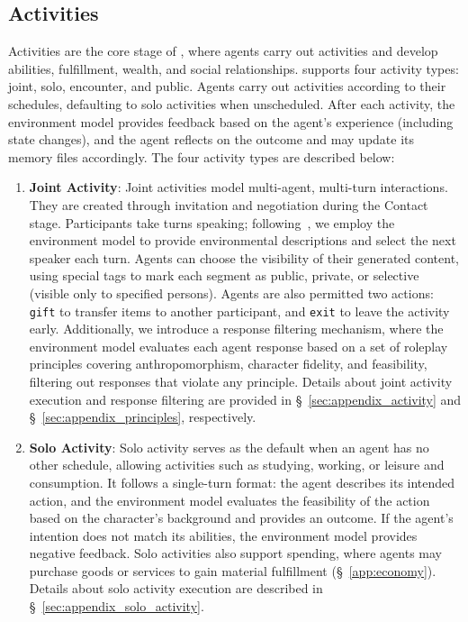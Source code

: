 \subsection{Activities}
\label{sec:activity}

Activities are the core stage of \method, where agents carry out activities and develop abilities, fulfillment, wealth, and social relationships.
\method supports four activity types: joint, solo, encounter, and public.
Agents carry out activities according to their schedules, defaulting to solo activities when unscheduled.
After each activity, the environment model provides feedback based on the agent's experience (including state changes), and the agent reflects on the outcome and may update its memory files accordingly.
The four activity types are described below:

\begin{enumerate}
\item \textbf{Joint Activity}:
Joint activities model multi-agent, multi-turn interactions.
They are created through invitation and negotiation during the Contact stage.
Participants take turns speaking; following~\citet{wang2025coser}, we employ the environment model to provide environmental descriptions and select the next speaker each turn.
Agents can choose the visibility of their generated content, using special tags to mark each segment as public, private, or selective (visible only to specified persons).
Agents are also permitted two actions: \texttt{gift} to transfer items to another participant, and \texttt{exit} to leave the activity early.
Additionally, we introduce a response filtering mechanism, where the environment model evaluates each agent response based on a set of roleplay principles covering anthropomorphism, character fidelity, and feasibility, filtering out responses that violate any principle.
Details about joint activity execution and response filtering are provided in \S~\ref{sec:appendix_activity} and \S~\ref{sec:appendix_principles}, respectively.

\item \textbf{Solo Activity}:
Solo activity serves as the default when an agent has no other schedule, allowing activities such as studying, working, or leisure and consumption.
It follows a single-turn format: the agent describes its intended action, and the environment model evaluates the feasibility of the action based on the character's background and provides an outcome.
If the agent's intention does not match its abilities, the environment model provides negative feedback.
Solo activities also support spending, where agents may purchase goods or services to gain material fulfillment (\S~\ref{app:economy}).
Details about solo activity execution are described in \S~\ref{sec:appendix_solo_activity}.


\end{enumerate}
